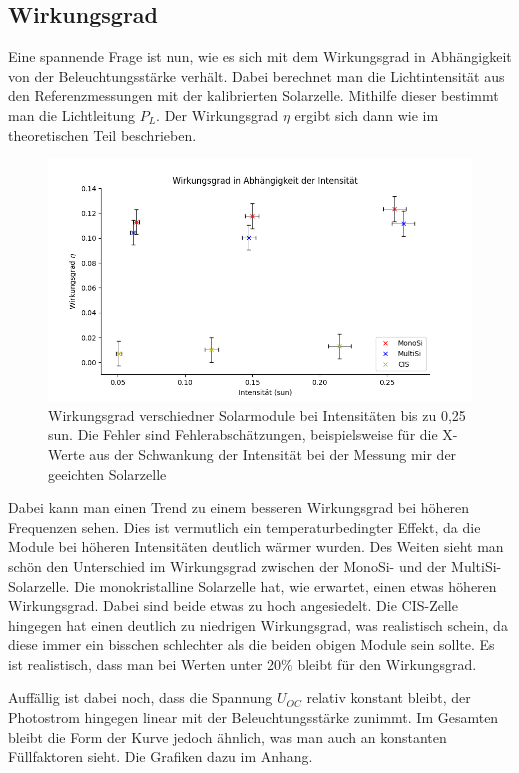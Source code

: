 \subsection{Wirkungsgrad}

Eine spannende Frage ist nun, wie es sich mit dem Wirkungsgrad in Abhängigkeit von der Beleuchtungsstärke verhält. 
Dabei berechnet man die Lichtintensität aus den Referenzmessungen mit der kalibrierten Solarzelle. Mithilfe dieser 
bestimmt man die Lichtleitung $P_L$. Der Wirkungsgrad $\eta$ ergibt sich dann wie im theoretischen Teil beschrieben. 

\begin{figure}[h]
    \centering
    \includegraphics[width = \linewidth]{Bilder/WirkungsgradInt.png}
    \caption{Wirkungsgrad verschiedner Solarmodule bei Intensitäten bis zu 0,25\,sun. Die Fehler sind Fehlerabschätzungen, 
    beispielsweise für die X-Werte aus der Schwankung der Intensität bei der Messung mir der geeichten Solarzelle}
\end{figure}

Dabei kann man einen Trend zu einem besseren Wirkungsgrad bei höheren Frequenzen sehen. Dies ist vermutlich ein 
temperaturbedingter Effekt, da die Module bei höheren Intensitäten deutlich wärmer wurden. Des Weiten sieht man schön den Unterschied 
im Wirkungsgrad zwischen der MonoSi- und der MultiSi-Solarzelle. Die monokristalline Solarzelle hat, wie erwartet, einen etwas höheren 
Wirkungsgrad. Dabei sind beide etwas zu hoch angesiedelt. 
Die CIS-Zelle hingegen hat einen deutlich zu niedrigen Wirkungsgrad, was realistisch schein, da diese immer ein bisschen schlechter als die beiden obigen Module 
sein sollte. Es ist realistisch, dass man bei Werten unter 20\% bleibt für den Wirkungsgrad.\

Auffällig ist dabei noch, dass die Spannung $U_{OC}$ relativ konstant bleibt, der Photostrom hingegen linear mit der Beleuchtungsstärke zunimmt. 
Im Gesamten bleibt die Form der Kurve jedoch ähnlich, was man auch an konstanten Füllfaktoren sieht. Die Grafiken dazu im Anhang.


